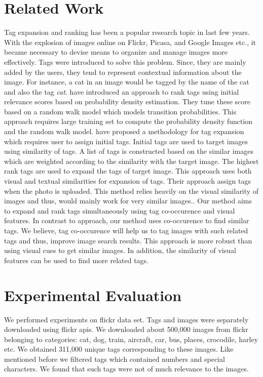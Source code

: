 \documentclass[12pt]{article}
\begin{document}
\section{Related Work}
Tag expansion and ranking has been a popular research topic in last few years. With the explosion of
images online on Flickr, Picasa, and Google Images etc., it became necessary to devise means to 
organize and manage images more effectively. Tags were introduced to solve this problem. Since,
they are mainly added by the users, they tend to represent contextual information about the image.
For instance, a cat in an image would be tagged by the name of the cat and also the tag \emph{cat}.
 have introduced an approach to rank tags using initial relevance 
scores based on probability density estimation. They tune these score based on a random walk model
which models transition probabilities. This approach requires large training set to compute the 
probability density function and the random walk model.  have 
proposed a methodology for tag expansion which requires user to assign initial tags. Initial tags
are used to target images using similarity of tags. A list of tags is constructed based on the similar images
which are weighted according to the similarity with the target image. The highest rank tags are used to 
expand the tags of target image. This approach uses both visual and textual similarities for expansion of tags.
Their approach assign tags when the photo is uploaded. This method relies heavily on the visual similarity
of images and thus, would mainly work for very similar images.. Our method aims to expand and rank tags simultaneously
using tag co-occurence and visual features. In contrast to  approach, 
our method uses co-occurence to find similar tags. We believe, tag co-occurence will help us to tag images with
such related tags and thus, improve image search results. This approach is more robust than using visual cues to
get similar images. In addition, the similarity of visual features can be used to find more related tags. 

\section{Experimental Evaluation}
We performed experiments on flickr data set. Tags and images were separately downloaded using
flickr apis. We downloaded about 500,000 images from flickr belonging to categories: cat,
dog, train, aircraft, car, bus, places, crocodile, harley etc. We obtained 311,000 unique tags
corresponding to these images. Like mentioned before we filtered tags which contained numbers
and special characters. We found that such tags were not of much relevance to the images.
\end{document}
